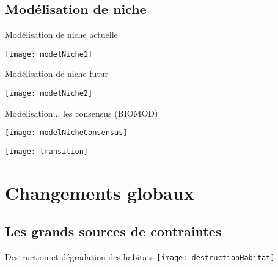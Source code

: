 \documentclass[10pt]{beamer}
\begin{document}
\subsection{Modélisation de niche} 

\begin{frame}{Modélisation de niche actuelle}
  \begin{center}
   \texttt{[image: modelNiche1]}
  \end{center}
\end{frame}

\begin{frame}{Modélisation de niche futur}
  \begin{center}
   \texttt{[image: modelNiche2]}
  \end{center}
\end{frame}


\begin{frame}{Modélisation... les consensus (BIOMOD)}
  \begin{center}
   \texttt{[image: modelNicheConsensus]}
  \end{center}
\end{frame}

\begin{frame}[plain]
  \texttt{[image: transition]}
\end{frame}





\section{Changements globaux}

\subsection{Les grands sources de contraintes} 


\begin{frame}{Destruction et dégradation des habitats}
  \texttt{[image: destructionHabitat]}
\end{frame}
\end{document}

